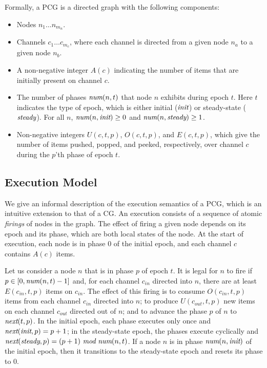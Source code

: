 Formally, a PCG is a directed graph with the following components:
\begin{itemize}

\item Nodes $n_1 \dots n_{m_n}$.

\item Channels $c_1 \dots c_{m_c}$, where each channel is directed
from a given node $n_a$ to a given node $n_b$.

\item A non-negative integer $A(c)$ indicating the number of items
  that are initially present on channel $c$.

\item The number of phases $\mbox{\it num}(n, t)$ that node $n$ exhibits
during epoch $t$.  Here $t$ indicates the type of epoch, which is
either initial ($\mbox{\it init}$) or steady-state ($\mbox{\it steady}$).  For all
$n$, $\mbox{\it num}(n, \mbox{\it init}) \ge 0$ and $\mbox{\it num}(n, \mbox{\it steady}) \ge
1$.

\item Non-negative integers $U(c, t, p)$, $O(c, t, p)$, and $E(c, t,
p)$, which give the number of items pushed, popped, and peeked,
respectively, over channel $c$ during the $p$'th phase of epoch $t$.

\end{itemize}

\subsection{Execution Model}

We give an informal description of the execution semantics of a PCG,
which is an intuitive extension to that of a CG.  An execution
consists of a sequence of atomic {\it firings} of nodes in the graph.
The effect of firing a given node depends on its epoch and its phase,
which are both local states of the node.  At the start of execution,
each node is in phase 0 of the initial epoch, and each channel $c$
contains $A(c)$ items.

Let us consider a node $n$ that is in phase $p$ of epoch $t$.  It is
legal for $n$ to fire if $p \in [0, \mbox{\it num}(n, t)-1]$ and, for each
channel $c_{in}$ directed into $n$, there are at least $E(c_{in}, t,
p)$ items on $c_{in}$.  The effect of this firing is to consume
$O(c_{in}, t, p)$ items from each channel $c_{in}$ directed into $n$;
to produce $U(c_{out}, t, p)$ new items on each channel $c_{out}$
directed out of $n$; and to advance the phase $p$ of $n$ to
$\mbox{\it next}(t, p)$.  In the initial epoch, each phase executes only
once and $\mbox{\it next}(\mbox{\it init}, p) = p + 1$; in the steady-state epoch,
the phases execute cyclically and $\mbox{\it next}(\mbox{\it steady}, p) = (p +
1)~\mbox{\it mod}~\mbox{\it num}(n, t)$.  If a node $n$ is in phase $\mbox{\it num}(n,
\mbox{\it init})$ of the initial epoch, then it transitions to the
steady-state epoch and resets its phase to 0.

